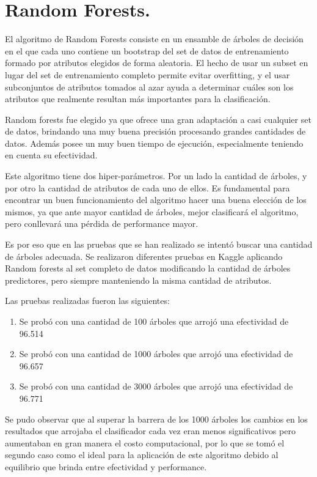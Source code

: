 \chapter{Random Forests.}
El algoritmo de Random Forests consiste en un ensamble de árboles de decisión en el que cada uno contiene un bootstrap del set de datos de entrenamiento formado por atributos elegidos de forma aleatoria. El hecho de usar un subset en lugar del set de entrenamiento completo permite evitar overfitting, y el usar subconjuntos de atributos tomados al azar ayuda a determinar cuáles son los atributos que realmente resultan más importantes para la clasificación.

Random forests fue elegido ya que ofrece una gran adaptación a casi cualquier set de datos, brindando una muy buena precisión procesando grandes cantidades de datos. Además posee un muy buen tiempo de ejecución, especialmente teniendo en cuenta su efectividad. 

Este algoritmo tiene dos hiper-parámetros. Por un lado la cantidad de árboles, y por otro la cantidad de atributos de cada uno de ellos. Es fundamental para encontrar un buen funcionamiento del algoritmo hacer una buena elección de los mismos, ya que ante mayor cantidad de árboles, mejor clasificará el algoritmo, pero conllevará una pérdida de performance mayor. 

Es por eso que en las pruebas que se han realizado se intentó buscar una cantidad de árboles adecuada.
Se realizaron diferentes pruebas en Kaggle aplicando Random forests al set completo de datos modificando la cantidad de árboles predictores,  pero siempre manteniendo la misma cantidad de atributos.

Las pruebas realizadas fueron las siguientes:
\begin{enumerate}
  \item Se probó con una cantidad de 100 árboles que arrojó una efectividad de 96.514%
  \item Se probó con una cantidad de 1000 árboles que arrojó una efectividad de 96.657%
  \item Se probó con una cantidad de 3000 árboles que arrojó una efectividad de 96.771%
\end{enumerate}

Se pudo observar que al superar la barrera de los 1000 árboles los cambios en los resultados que arrojaba el clasificador cada vez eran menos significativos pero aumentaban en gran manera el costo computacional, por lo que se tomó el segundo caso como el ideal para la aplicación de este algoritmo debido al equilibrio que brinda entre efectividad y performance.
